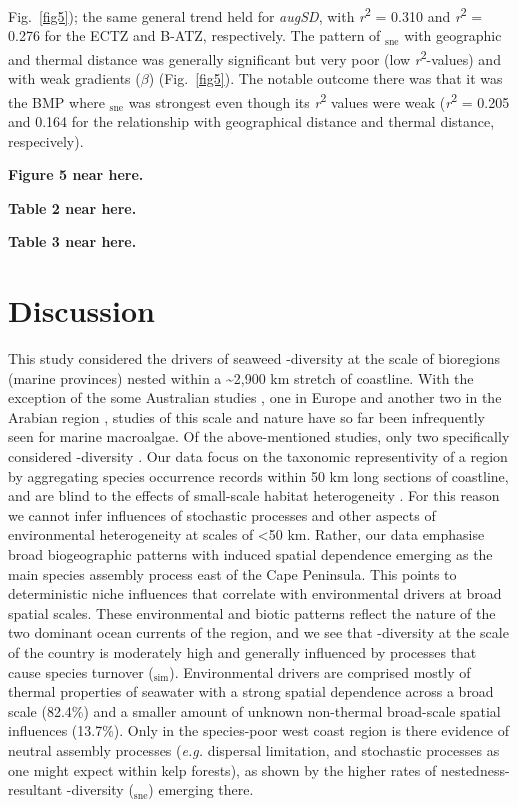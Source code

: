 \documentclass[utf8]{frontiersSCNS} %
\begin{document}
Fig.~\ref{fig5}); the same general trend held for \emph{augSD}, with \emph{r}\textsuperscript{2} = 0.310 and \emph{r}\textsuperscript{2} = 0.276 for the ECTZ and B-ATZ, respectively. The pattern of \textbeta$_{\text{sne}}$ with geographic and thermal distance was generally significant but very poor (low \emph{r}\textsuperscript{2}-values) and with weak gradients ($\beta$) (Fig.~\ref{fig5}). The notable outcome there was that it was the BMP where \textbeta$_{\text{sne}}$ was strongest even though its \emph{r}\textsuperscript{2} values were weak (\emph{r}\textsuperscript{2} = 0.205 and 0.164 for the relationship with geographical distance and thermal distance, respecively).

\textbf{Figure 5 near here.}

\textbf{Table 2 near here.}

\textbf{Table 3 near here.}

\section{Discussion}

This study considered the drivers of seaweed \textbeta-diversity at the scale of bioregions (marine provinces) nested within a \textasciitilde{}2,900 km stretch of coastline. With the exception of the some Australian studies \citep{Smale2010,Smale2011,Waters2010,Leaper2011,Wernberg2013}, one in Europe \citep{Tuya2012} and another two in the Arabian region \citep{Schils2006,Issa2014}, studies of this scale and nature have so far been infrequently seen for marine macroalgae. Of the above-mentioned studies, only two specifically considered \textbeta-diversity \citep{Leaper2011,Issa2014}. Our data focus on the taxonomic representivity of a region by aggregating species occurrence records within 50 km long sections of coastline, and are blind to the effects of small-scale habitat heterogeneity \citep[\emph{e.g.} as seen in][]{Smale2010}. For this reason we cannot infer influences of stochastic processes and other aspects of environmental heterogeneity at scales of \textless{}50 km. Rather, our data emphasise broad biogeographic patterns \citep{Lawton1999} with induced spatial dependence \citep{PeresNeto2010} emerging as the main species assembly process east of the Cape Peninsula. This points to deterministic niche influences that correlate with environmental drivers at broad spatial scales. These environmental and biotic patterns reflect the nature of the two dominant ocean currents of the region, and we see that \textbeta-diversity at the scale of the country is moderately high and generally influenced by processes that cause species turnover (\textbeta$_{\text{sim}}$). Environmental drivers are comprised mostly of thermal properties of seawater with a strong spatial dependence across a broad scale (82.4\%) and a smaller amount of unknown non-thermal broad-scale spatial influences (13.7\%). Only in the species-poor west coast region is there evidence of neutral assembly processes (\emph{e.g.} dispersal limitation, and stochastic processes as one might expect within kelp forests), as shown by the higher rates of nestedness-resultant \textbeta-diversity (\textbeta$_{\text{sne}}$) emerging there.
\end{document}
